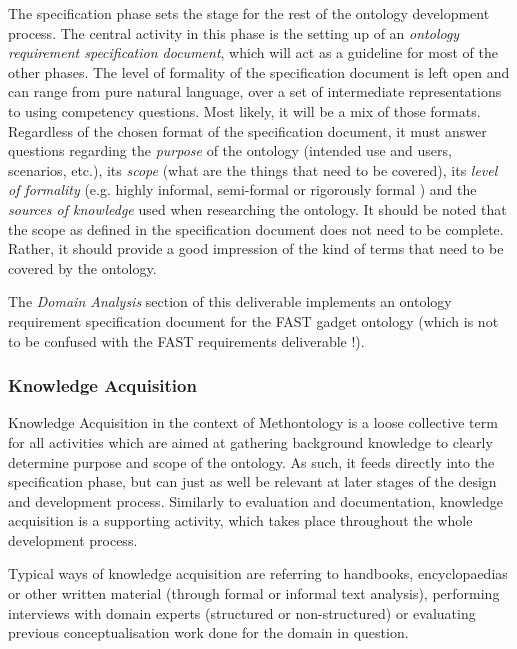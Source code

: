 \documentclass[twoside]{fast_latex}
\begin{document}
The specification phase sets the stage for the rest of the ontology development process. The central activity in this phase is the setting up of an \emph{ontology requirement specification document}, which will act as a guideline for most of the other phases. The level of formality of the specification document is left open and can range from pure natural language, over a set of intermediate representations to using competency questions. Most likely, it will be a mix of those formats. Regardless of the chosen format of the specification document, it must answer questions regarding the \emph{purpose} of the ontology (intended use and users, scenarios, etc.), its \emph{scope} (what are the things that need to be covered), its \emph{level of formality} (e.g. highly informal, semi-formal or rigorously formal \cite{uschold1996ontologies}) and the \emph{sources of knowledge} used when researching the ontology. It should be noted that the scope as defined in the specification document does not need to be complete. Rather, it should provide a good impression of the kind of terms that need to be covered by the ontology.

The \emph{Domain Analysis} section of this deliverable implements an ontology requirement specification document for the FAST gadget ontology (which is not to be confused with the FAST requirements deliverable \cite{villoslada2010fast_requirements}!).

\subsubsection{Knowledge Acquisition} %
\label{ssub:knowledge_acquisition}

Knowledge Acquisition in the context of Methontology is a loose collective term for all activities which are aimed at gathering background knowledge to clearly determine purpose and scope of the ontology. As such, it feeds directly into the specification phase, but can just as well be relevant at later stages of the design and development process. Similarly to evaluation and documentation, knowledge acquisition is a supporting activity, which takes place throughout the whole development process.

Typical ways of knowledge acquisition are referring to handbooks, encyclopaedias or other written material (through formal or informal text analysis), performing interviews with domain experts (structured or non-structured) or evaluating previous conceptualisation work done for the domain in question.
\end{document}
